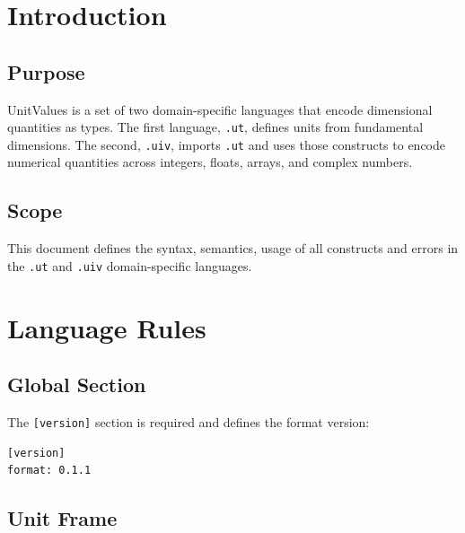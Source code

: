 \documentclass[11pt]{article}
\title{}
\author{}
\date{}
\begin{document}
\maketitle
\thispagestyle{empty}
\newpage

\section{Introduction}

\subsection{Purpose}

UnitValues is a set of two domain-specific languages that encode dimensional quantities as types. The first language, 
\texttt{.ut}, defines units from fundamental dimensions. The second, \texttt{.uiv}, imports 
\texttt{.ut} and uses those constructs to encode numerical quantities across integers, floats, arrays, and complex numbers.

\subsection{Scope}

This document defines the syntax, semantics, usage of all constructs and errors
in the \texttt{.ut} and \texttt{.uiv} domain-specific languages.

\section{Language Rules}

\subsection{Global Section}

The \texttt{[version]} section is required and defines the format version:

\begin{lstlisting}[language=UnitValuesUT]
[version]
format: 0.1.1
\end{lstlisting}

\subsection{Unit Frame}
\end{document}
